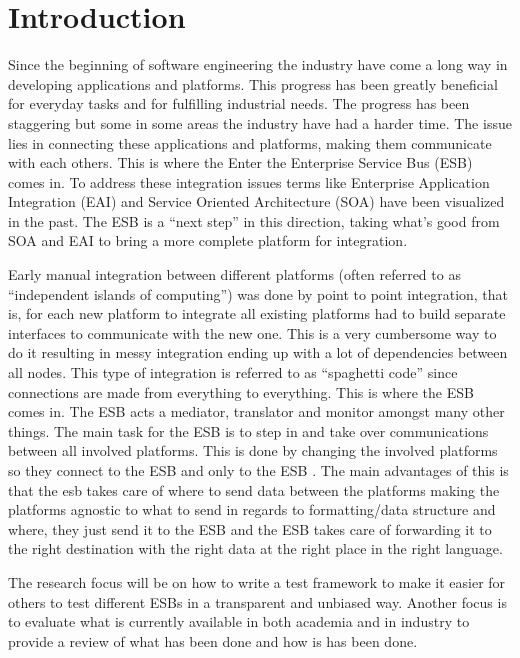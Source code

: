 \section{Introduction} %

Since the beginning of software engineering the industry have come a long way in developing applications and platforms. 
This progress has been greatly beneficial for everyday tasks and for fulfilling industrial needs. 
The progress has been staggering but some in some areas the industry have had a harder time. 
The issue lies in connecting these applications and platforms, making them communicate with each others. This is where the Enter the Enterprise Service Bus (ESB) \cite{falko07} comes in. 
To address these integration issues terms like Enterprise Application Integration (EAI) \cite{Du2008} and Service Oriented Architecture (SOA) \cite{Abuosba2008} have been visualized in the past. 
The ESB is a ``next step'' in this direction, taking what's good from SOA and EAI to bring a more complete platform for integration.

Early manual integration between different platforms (often referred to as ``independent islands of computing'') was done by point to point integration, that is, for each new platform to integrate all existing platforms had to build separate interfaces to communicate with the new one. 
This is a very cumbersome way to do it resulting in messy integration ending up with a lot of dependencies between all nodes.
This type of integration is referred to as ``spaghetti code'' since connections are made from everything to everything. 
This is where the ESB comes in. The ESB acts a mediator, translator and monitor amongst many other things. The main task for the ESB is to step in and take over communications between all involved platforms. 
This is done by changing the involved platforms so they connect to the ESB and only to the ESB \cite{Sanjay2011}. 
The main advantages of this is that the esb takes care of where to send data between the platforms making the platforms agnostic to what to send in regards to formatting/data structure and where, they just send it to the ESB and the ESB takes care of forwarding it to the right destination with the right data at the right place in the right language.

The research focus will be on how to write a test framework to make it easier for others to test different ESBs in a transparent and unbiased way. 
Another focus is to evaluate what is currently available in both academia and in industry to provide a review of what has been done and how is has been done.

